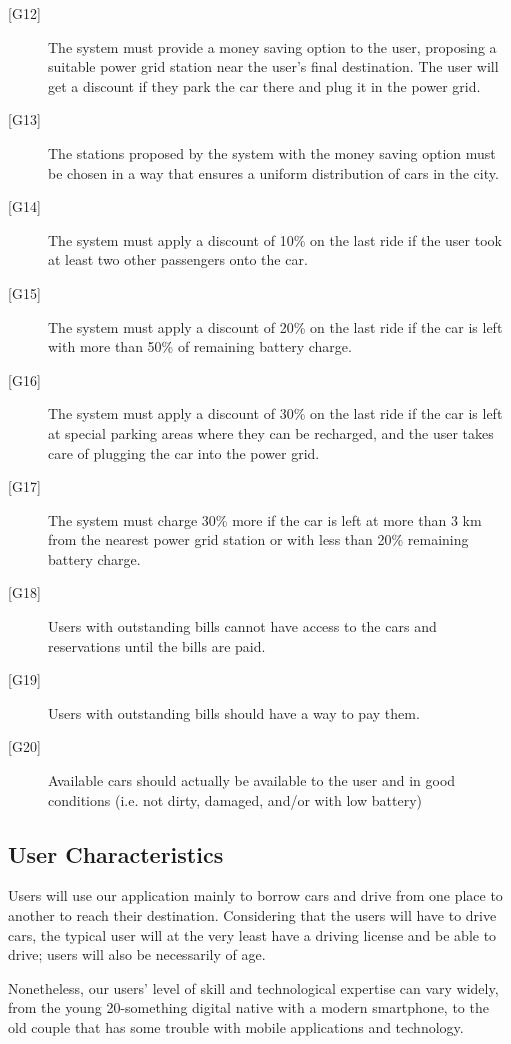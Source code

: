 \documentclass[english]{article}
\begin{document}
\begin{description}
	\item[{[G12]}]{The system must provide a money saving option to the user, proposing a suitable power grid station near the user’s final destination. The user will get a discount if they park the car there and plug it in the power grid.}
	\item[{[G13]}]{The stations proposed by the system with the money saving option must be chosen in a way that ensures a uniform distribution of cars in the city.}
	\item[{[G14]}]{The system must apply a discount of 10\% on the last ride if the user took at least two other passengers onto the car.}
	\item[{[G15]}]{The system must apply a discount of 20\% on the last ride if the car is left with more than 50\% of remaining battery charge.}
	\item[{[G16]}]{The system must apply a discount of 30\% on the last ride if the car is left at special parking areas where they can be recharged, and the user takes care of plugging the car into the power grid.}
	\item[{[G17]}]{The system must charge 30\% more if the car is left at more than 3 km from the nearest power grid station or with less than 20\% remaining battery charge.}
	\item[{[G18]}]{Users with outstanding bills cannot have access to the cars and reservations until the bills are paid.}
	\item[{[G19]}]{Users with outstanding bills should have a way to pay them.}
	\item[{[G20]}]{Available cars should actually be available to the user and in good conditions (i.e. not dirty, damaged, and/or with low battery)}
\end{description}

\subsection{User Characteristics}

Users will use our application mainly to borrow cars and drive from one place to another to reach their destination. Considering that the users will have to drive cars, the typical user will at the very least have a driving license and be able to drive; users will also be necessarily of age.

Nonetheless, our users' level of skill and technological expertise can vary widely, from the young 20-something digital native with a modern smartphone, to the old couple that has some trouble with mobile applications and technology.
\end{document}
